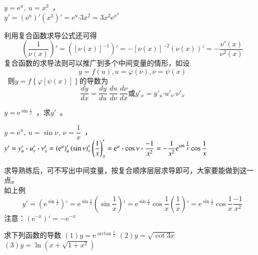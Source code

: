\begin{solution}
$y=\mathrm{e}^u,~u=x^3$~，\\
$y'=\left(\mathrm{e}^u\right)'\left(x^3\right)'=\mathrm{e}^u\bm\cdot 3x^2=3x^2\mathrm{e}^{x^3}$
\end{solution}
利用复合函数求导公式还可得\[\left(\dfrac{1}{\nu (x)}\right)'=\left(\left[\nu (x)\right]^{-1}\right)'=-\left[\nu (x)\right]^{-2}\left(\nu (x)\right)'=-\dfrac{\nu '(x)}{\nu ^2(x)}\]
复合函数的求导法则可以推广到多个中间变量的情形，如设\[y=f(u),u=\varphi(\nu),\nu=\psi(x)\]~则$y=f\left\{\varphi\left[\psi(x)\right]\right\}$的导数为\[\dfrac{dy}{dx}=\dfrac{dy}{du}\ \dfrac{du}{d\nu}\ \dfrac{d\nu}{dx}\text{或}y'_x=y'_u\bm\cdot u'_\nu\bm\cdot \nu'_x\]
\begin{example}
$y=\mathrm{e}^{\sin \tfrac{1}{x}}$~，求$y'$~。
\end{example}
\begin{solution}
$y=\mathrm{e}^u,~u=\sin \nu,~\nu=\dfrac{1}{x}$~，\\
$y'=y'_u\bm\cdot u'_\nu\bm\cdot \nu'_x=\left(\mathrm{e}^u\right)'_u\left(\sin \nu\right)'_\nu\left(\dfrac{1}{x}\right)'_x=\mathrm{e}^u\bm\cdot \cos \nu\bm\cdot \dfrac{-1}{x^2}\\
=-\dfrac{1}{x^2}\mathrm{e}^{\sin \tfrac{1}{x}}\cos \dfrac{1}{x}$
\end{solution}
求导熟练后，可不写出中间变量，按复合顺序层层求导即可，大家要能做到这一点。\\
如上例\[
y'=\left(\mathrm{e}^{\sin \frac{1}{x}}\right)'=\mathrm{e}^{\sin \tfrac{1}{x}}\left(\sin \dfrac{1}{x}\right)'=\mathrm{e}^{\sin \tfrac{1}{x}}\cos \dfrac{1}{x}\left(\dfrac{1}{x}\right)'=\mathrm{e}^{\sin \tfrac{1}{x}}\cos \dfrac{1}{x}\dfrac{-1}{x^2}
\]
{\kaishu \color{blue}注意：$\left(\mathrm{e}^{-x}\right)'=-\mathrm{e}^{-x}$
}
\begin{example}
求下列函数的导数
$(1) y=\mathrm{e}^{\arctan\tfrac{1}{x}}$
$(2) y=\sqrt{\cot 3x}$
$(3) y=\ln \left(x+\sqrt{1+x^2}\right)$
\end{example}
